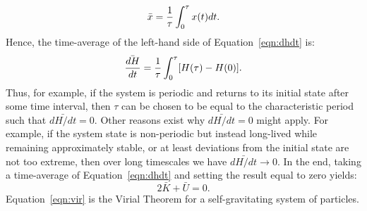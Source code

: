 \documentclass[main.tex]{subfiles}
\begin{document}
\begin{tcolorbox}[sharp corners, colback=green!30, colframe=green!80!blue, title=Virial Theorem$^{10}$]
{\begin{equation}
\bar{x} = \frac{1}{\tau}\int_{0}^{\rm \tau} x(t)dt.
\end{equation}
Hence, the time-average of the left-hand side of Equation~\ref{eqn:dhdt} is:
\begin{equation}
\bar{\frac{dH}{dt}} = \frac{1}{\tau}\int_{0}^{\rm \tau} [H(\tau) - H(0)].
\end{equation}
Thus, for example, if the system is periodic and returns to its initial state after some time interval, then $\tau$ can be chosen to be equal to the characteristic period such that $\bar{dH/dt} = 0$.  Other reasons exist why $\bar{dH/dt} = 0$ might apply.  For example, if the system state is non-periodic but instead long-lived while remaining approximately stable, or at least deviations from the initial state are not too extreme, then over long timescales we have $\bar{dH/dt} \rightarrow 0$.  In the end, taking a time-average of Equation~\ref{eqn:dhdt} and setting the result equal to zero yields:
\begin{equation}
2\bar{K} + \bar{U} = 0.
\label{eqn:vir}
\end{equation}
Equation~\ref{eqn:vir} is the Virial Theorem for a self-gravitating system of particles.}
\end{tcolorbox}
\end{document}
